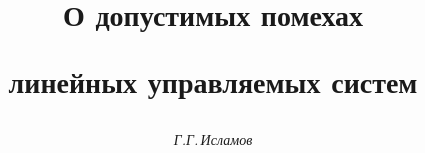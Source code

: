 




%





\newcommand{\Int}{\operatorname{int}}


\newcommand{\tts}[1]{}


\renewcommand{\baselinestretch}{0.97}







\setcounter{page}{37}















\author{\it Г.Г.\,Исламов}




\title{О допустимых помехах


линейных управляемых систем}





\date{}




\pagestyle{plain} %







\maketitle


